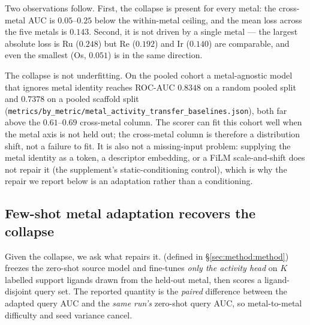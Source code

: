 Two observations follow. First, the collapse is present for every metal: the
cross-metal AUC is $0.05$--$0.25$ below the within-metal ceiling, and the mean
loss across the five metals is $0.143$. Second, it is not driven by a single
metal --- the largest absolute loss is Ru ($0.248$) but Re ($0.192$) and Ir
($0.140$) are comparable, and even the smallest (Os, $0.051$) is in the same
direction.

The collapse is not underfitting. On the pooled cohort a metal-agnostic model
that ignores metal identity reaches ROC-AUC $0.8348$ on a random pooled split
and $0.7378$ on a pooled scaffold split
(\texttt{metrics/by\_metric/metal\_activity\_transfer\_baselines.json}), both
far above the $0.61$--$0.69$ cross-metal column. The scorer can fit this cohort
well when the metal axis is not held out; the cross-metal column is therefore a
distribution shift, not a failure to fit. It is also not a missing-input
problem: supplying the metal identity as a token, a descriptor embedding, or a
FiLM scale-and-shift does not repair it (the supplement's static-conditioning
control), which is why the repair we report below is an adaptation rather than a
conditioning.

\subsection{Few-shot metal adaptation recovers the collapse}
\label{sec:results:kshot}

Given the collapse, we ask what repairs it. \fsma{} (defined in
\S\ref{sec:method:method}) freezes the zero-shot source model and fine-tunes
\emph{only the activity head} on $K$ labelled support ligands drawn from the
held-out metal, then scores a ligand-disjoint query set. The reported quantity
is the \emph{paired} difference between the adapted query AUC and the
\emph{same run's} zero-shot query AUC, so metal-to-metal difficulty and seed
variance cancel.

